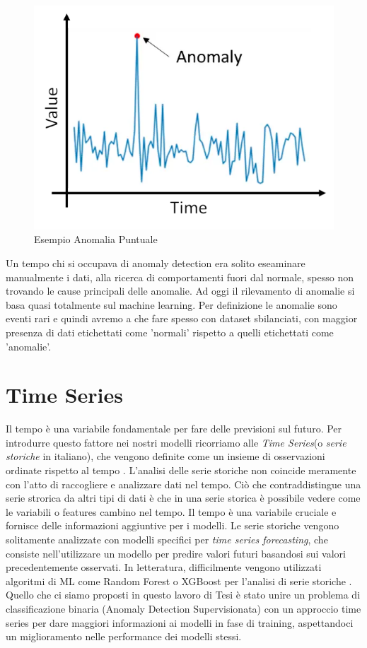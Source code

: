 \begin{figure}[H]
    \centering
    \includegraphics[width=0.6\linewidth]{anomalie.png}
    \caption{Esempio Anomalia Puntuale}
    \label{fig:enter-label}
\end{figure}


Un tempo chi si occupava di anomaly detection era solito eseaminare manualmente i dati, alla ricerca di comportamenti fuori dal normale, spesso non trovando le cause principali delle anomalie. Ad oggi il rilevamento di anomalie si basa quasi totalmente sul machine learning. Per definizione le anomalie sono eventi rari e quindi avremo a che fare spesso con dataset sbilanciati, con maggior presenza di dati etichettati come 'normali' rispetto a quelli etichettati come 'anomalie'.

\section{Time Series}
Il tempo \`e una variabile fondamentale per fare delle previsioni sul futuro. Per introdurre questo fattore nei nostri modelli ricorriamo alle \textit{Time Series}(o \textit{serie storiche} in italiano), che vengono definite come un insieme di osservazioni ordinate rispetto al tempo \cite{time_series}. L'analisi delle serie storiche non coincide meramente con l'atto di raccogliere e analizzare dati nel tempo. Ci\`o che contraddistingue una serie strorica da altri tipi di dati \`e che in una serie storica \`e possibile vedere come le variabili o features cambino nel tempo. Il tempo \`e una variabile cruciale e fornisce delle informazioni aggiuntive per i modelli.
Le serie storiche vengono solitamente analizzate con modelli specifici per \textit{time series forecasting}, che consiste nell'utilizzare un modello per predire valori futuri basandosi sui valori precedentemente osservati. In letteratura, difficilmente vengono utilizzati algoritmi di ML come Random Forest o XGBoost per l'analisi di serie storiche \cite{time_series_link}. Quello che ci siamo proposti in questo lavoro di Tesi \`e stato unire un problema di classificazione binaria (Anomaly Detection Supervisionata) con un approccio time series per dare maggiori informazioni ai modelli in fase di training, aspettandoci un miglioramento nelle performance dei modelli stessi.

 \vspace{-0.5cm}
 \vspace{-0.3cm}
